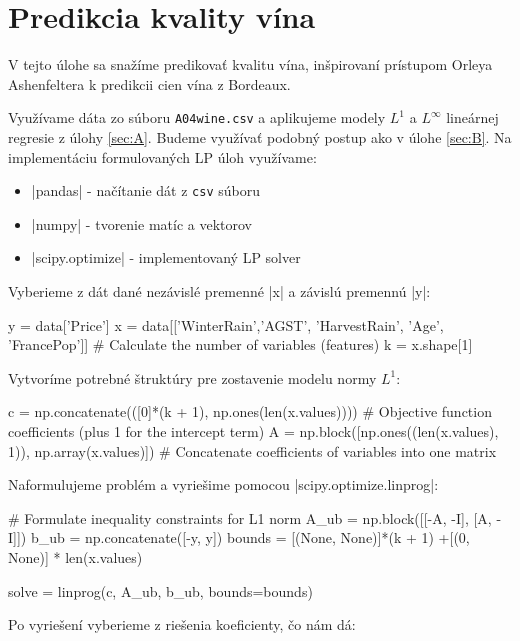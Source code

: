 \documentclass[report.tex]{subfiles}
\begin{document}
   

\section{Predikcia kvality vína}\label{sec:C}
V tejto úlohe sa snažíme predikovať kvalitu vína, inšpirovaní prístupom Orleya Ashenfeltera k predikcii cien vína z Bordeaux.

Využívame dáta zo súboru \verb|A04wine.csv| a aplikujeme modely $L^1$ a $L^{\infty}$ lineárnej regresie z úlohy \ref{sec:A}. Budeme využívať podobný postup ako v úlohe \ref{sec:B}. Na implementáciu formulovaných LP úloh využívame:
\begin{itemize}
	\item \pyth|pandas| - načítanie dát z \verb|csv| súboru
	\item \pyth|numpy| - tvorenie matíc a vektorov
	\item \pyth|scipy.optimize| - implementovaný LP solver
\end{itemize}

Vyberieme z dát dané nezávislé premenné \pyth|x| a závislú premennú \pyth|y|:

\begin{python}
y = data['Price']
x = data[['WinterRain','AGST', 'HarvestRain', 'Age', 'FrancePop']]
# Calculate the number of variables (features)
k = x.shape[1]
\end{python}

Vytvoríme potrebné štruktúry pre zostavenie modelu normy $L^1$:

\begin{python}
c = np.concatenate(([0]*(k + 1), np.ones(len(x.values)))) # Objective function coefficients (plus 1 for the intercept term)
A = np.block([np.ones((len(x.values), 1)), np.array(x.values)]) # Concatenate coefficients of variables into one matrix
\end{python}

Naformulujeme problém a vyriešime pomocou \pyth|scipy.optimize.linprog|:

\begin{python}
# Formulate inequality constraints for L1 norm
A_ub = np.block([[-A, -I], [A, -I]])
b_ub = np.concatenate([-y, y])
bounds = [(None, None)]*(k + 1) +[(0, None)] * len(x.values)

solve = linprog(c, A_ub, b_ub, bounds=bounds)
\end{python}

Po vyriešení vyberieme z riešenia koeficienty, čo nám dá: 
\end{document}
